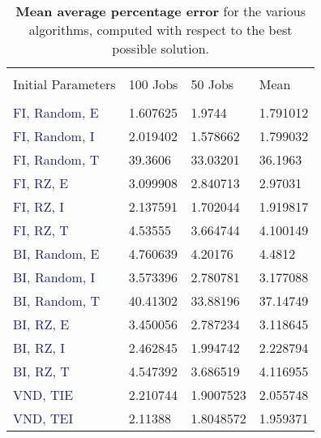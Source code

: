 \documentclass[
12pt,
a4paper,
oneside,
headinclude,
footinclude]{article}
\theoremstyle{definition} %
\begin{document}
    \begin{table}[H]
        \centering %
        \begin{tabular}{l l l l} %
            \hline
            \hline 
            \\[-1.5ex]
            \textcolor{BrickRed}{Initial Parameters} & \textcolor{BrickRed}{100 Jobs} & \textcolor{BrickRed}{50 Jobs} & \textcolor{BrickRed}{Mean}\\ [0.5ex]
            \hline %
            \\[-1.5ex]
            \textcolor{MidnightBlue}{FI, Random, E} & 1.607625   & 1.9744         & 1.791012    \\
            \textcolor{MidnightBlue}{FI, Random, I} & 2.019402   &  1.578662      & 1.799032    \\
            \textcolor{MidnightBlue}{FI, Random, T} & 39.3606    &  33.03201      & 36.1963     \\
            \textcolor{MidnightBlue}{FI, RZ, E}     & 3.099908   &  2.840713      & 2.97031  \\
            \textcolor{MidnightBlue}{FI, RZ, I}     & 2.137591   &   1.702044     & 1.919817    \\
            \textcolor{MidnightBlue}{FI, RZ, T}     & 4.53555    &    3.664744    & 4.100149    \\
            \textcolor{MidnightBlue}{BI, Random, E} & 4.760639   &   4.20176      & 4.4812    \\
            \textcolor{MidnightBlue}{BI, Random, I} & 3.573396   &    2.780781    & 3.177088   \\
            \textcolor{MidnightBlue}{BI, Random, T} & 40.41302   &   33.88196     & 37.14749    \\
            \textcolor{MidnightBlue}{BI, RZ, E}     & 3.450056   &   2.787234     & 3.118645   \\
            \textcolor{MidnightBlue}{BI, RZ, I}     & 2.462845   &  1.994742      & 2.228794   \\
            \textcolor{MidnightBlue}{BI, RZ, T}     & 4.547392   &   3.686519     & 4.116955   \\ 
            \textcolor{MidnightBlue}{VND, TIE}     & 2.210744   &   1.9007523    & 2.055748  \\ 
            \textcolor{MidnightBlue}{VND, TEI}     & 2.11388   &   1.8048572     & 1.959371  
            \\[1ex] %
            \hline %
        \end{tabular}
        \caption{\label{tab:mape}\textbf{Mean average percentage error} for the various algorithms, computed with respect to the best possible solution.}
    \end{table} 
    
\end{document}
